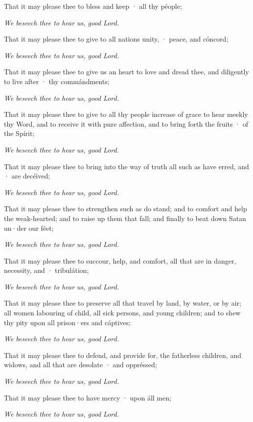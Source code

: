 That it may please thee to bless and keep · all thy péople;

\centerline{\emph{We beseech thee to hear us, good Lord.}}

That it may please thee to give to all nations unity, · peace, and cóncord;

\centerline{\emph{We beseech thee to hear us, good Lord.}}

That it may please thee to give us an heart to love and dread thee, and diligently to live after · thy commándments;

\centerline{\emph{We beseech thee to hear us, good Lord.}}

That it may please thee to give to all thy people increase of grace to hear meekly thy Word, and to receive it with pure affection, and to bring forth the fruits · of the Spírit;

\centerline{\emph{We beseech thee to hear us, good Lord.}}

That it may please thee to bring into the way of truth all such as have erred, and · are decéived;

\centerline{\emph{We beseech thee to hear us, good Lord.}}

That it may please thee to strengthen such as do stand; and to comfort and help the weak-hearted; and to raise up them that fall; and finally to beat down Satan un·der our féet;

\centerline{\emph{We beseech thee to hear us, good Lord.}}

That it may please thee to succour, help, and comfort, all that are in danger, necessity, and · tribulátion;

\centerline{\emph{We beseech thee to hear us, good Lord.}}

That it may please thee to preserve all that travel by land, by water, or by air; all women labouring of child, all sick persons, and young children; and to shew thy pity upon all prison·ers and cáptives; 

\centerline{\emph{We beseech thee to hear us, good Lord.}}

That it may please thee to defend, and provide for, the fatherless children, and widows, and all that are desolate · and oppréssed;

\centerline{\emph{We beseech thee to hear us, good Lord.}}

That it may please thee to have mercy · upon áll men;

\centerline{\emph{We beseech thee to hear us, good Lord.}}

